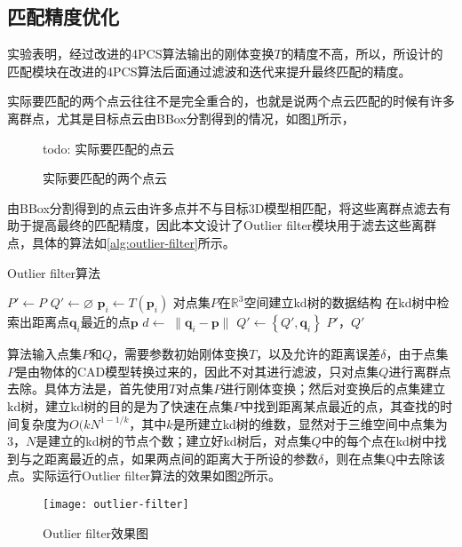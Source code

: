 \subsection{匹配精度优化}
实验表明，经过改进的4PCS算法输出的刚体变换$T$的精度不高，所以，所设计的匹配模块在改进的4PCS算法后面通过滤波和迭代来提升最终匹配的精度。

实际要匹配的两个点云往往不是完全重合的，也就是说两个点云匹配的时候有许多离群点，尤其是目标点云由BBox分割得到的情况，如图\ref{fig:outlier-pointcloud}所示，
\begin{figure}[ht]
  \centering
  \subfloat[目标3D模型转化的点云]{
  }
  \hskip1cm
  \subfloat[由BBox分割得到的点云]{
  }
  todo: 实际要匹配的点云
  \caption{实际要匹配的两个点云}
  \label{fig:outlier-pointcloud}
\end{figure}
由BBox分割得到的点云由许多点并不与目标3D模型相匹配，将这些离群点滤去有助于提高最终的匹配精度，因此本文设计了Outlier filter模块用于滤去这些离群点，具体的算法如\ref{alg:outlier-filter}所示。
\begin{algorithm}[ht]
  \caption{Outlier filter算法}
  \label{alg:outlier-filter}
  $P'\leftarrow P$\;
  $Q'\leftarrow \varnothing$\;
   {
    $\mathbf{p}_i\leftarrow T(\mathbf{p}_i)$\;
  }
  对点集$P$在$\mathbb{R}^3$空间建立kd树的数据结构\;
   {
    在kd树中检索出距离点$\mathbf{q}_i$最近的点$\mathbf{p}$\;
    $d\leftarrow\;\parallel\mathbf{q}_i-\mathbf{p}\parallel$\;
     {
      $Q'\leftarrow \left\{Q', \mathbf{q}_i\right\}$\;
    }
  }
  \Return $P'$，$Q'$\;
\end{algorithm}
算法输入点集$P$和$Q$，需要参数初始刚体变换$T$，以及允许的距离误差$\delta$，由于点集$P$是由物体的CAD模型转换过来的，因此不对其进行滤波，只对点集$Q$进行离群点去除。具体方法是，首先使用$T$对点集$P$进行刚体变换；然后对变换后的点集建立kd树，建立kd树的目的是为了快速在点集$P$中找到距离某点最近的点，其查找的时间复杂度为$O(kN^{1-1/k}$，其中$k$是所建立kd树的维数，显然对于三维空间中点集为3，$N$是建立的kd树的节点个数；建立好kd树后，对点集$Q$中的每个点在kd树中找到与之距离最近的点，如果两点间的距离大于所设的参数$\delta$，则在点集Q中去除该点。实际运行Outlier filter算法的效果如图\ref{fig:outlier-filter}所示。
\begin{figure}[ht]
  \centering
  \texttt{[image: outlier-filter]}
  \caption{Outlier filter效果图}
  \label{fig:outlier-filter}
\end{figure}

